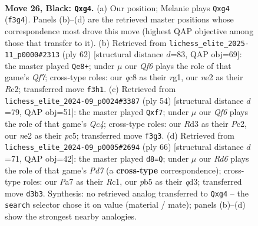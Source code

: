 \documentclass[11pt]{article}
\begin{document}
\clearpage

\begin{figure}[p]\centering
\begin{subfigure}{0.46\textwidth}\centering
\resizebox{\linewidth}{!}{%
\newchessgame
\chessboard[
  setfen={2Q5/pp1n2kp/7p/1P4b1/3P2P1/3r1q2/4N3/R3KB1R b - - 1 26},
  showmover=false,
  pgfstyle=straightmove, color=movearrow, markmove={f3-g4}
]}
\caption{}
\end{subfigure}\hfill
\begin{subfigure}{0.46\textwidth}\centering
\resizebox{\linewidth}{!}{%
\newchessgame
\chessboard[
  setfen={7k/3n1Q1p/4pb2/5p2/2pP1B2/p3P3/P1R1KP1P/1q2N1r1 w - - 2 32},
  showmover=false,
  pgfstyle=straightmove, color=movearrow, markmove={f7-e8}
]}
\caption{}
\end{subfigure}
\\[4pt]
\begin{subfigure}{0.46\textwidth}\centering
\resizebox{\linewidth}{!}{%
\newchessgame
\chessboard[
  setfen={1q2r3/3R1rbk/p2R3p/2p2p2/P1Q2P2/8/1PP4P/6K1 w - - 0 28},
  showmover=false,
  pgfstyle=straightmove, color=movearrow, markmove={c4-f7}
]}
\caption{}
\end{subfigure}\hfill
\begin{subfigure}{0.46\textwidth}\centering
\resizebox{\linewidth}{!}{%
\newchessgame
\chessboard[
  setfen={8/kb1P1Q1p/5nr1/p5B1/P6P/3q4/5PP1/2R3K1 w - - 1 34},
  showmover=false,
  pgfstyle=straightmove, color=movearrow, markmove={d7-d8}
]}
\caption{}
\end{subfigure}
\caption{\textbf{Move 26, Black: \texttt{Qxg4}.} (a) Our position; Melanie plays \texttt{Qxg4} (\texttt{f3g4}). Panels (b)--(d) are the retrieved master positions whose correspondence most drove this move (highest QAP objective among those that transfer to it). (b) Retrieved from \texttt{lichess\_elite\_2025-11\_p0000\#2313} (ply 62) [structural distance $d$=83, QAP obj=69]: the master played \texttt{Qe8+}; under $\mu$ our \emph{Qf6} plays the role of that game's \emph{Qf7}; cross-type roles: our \emph{q}c8 as their \emph{r}g1, our \emph{n}e2 as their \emph{R}c2; transferred move \texttt{f3h1}. (c) Retrieved from \texttt{lichess\_elite\_2024-09\_p0024\#3387} (ply 54) [structural distance $d$=79, QAP obj=51]: the master played \texttt{Qxf7}; under $\mu$ our \emph{Qf6} plays the role of that game's \emph{Qc4}; cross-type roles: our \emph{R}d3 as their \emph{P}c2, our \emph{n}e2 as their \emph{p}c5; transferred move \texttt{f3g3}. (d) Retrieved from \texttt{lichess\_elite\_2024-09\_p0005\#2694} (ply 66) [structural distance $d$=71, QAP obj=42]: the master played \texttt{d8=Q}; under $\mu$ our \emph{Rd6} plays the role of that game's \emph{Pd7} (a \textbf{cross-type} correspondence); cross-type roles: our \emph{P}a7 as their \emph{R}c1, our \emph{p}b5 as their \emph{q}d3; transferred move \texttt{d3b3}. Synthesis: no retrieved analog transferred to \texttt{Qxg4} -- the \texttt{search} selector chose it on value (material / mate); panels (b)--(d) show the strongest nearby analogies.}
\label{fig:thought-m51}
\end{figure}
\end{document}
